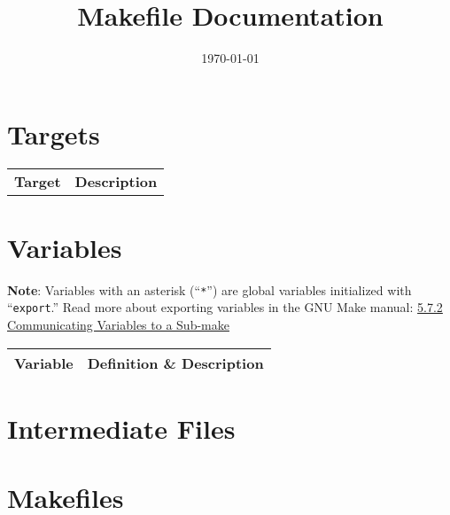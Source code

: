 \documentclass[oneside,11pt]{memoir}
\title{Makefile Documentation}
\date{\today}
\author{}
\begin{document}
    

    \begin{center}
    \end{center}

    \section{Targets}
    \label{targets}

    \tabulinesep=1.2mm
    \begin{longtabu} to 
        \textbf{Target} & \textbf{Description} \\

        

    \end{longtabu}

    \section{Variables}
    \label{variables}

    \textbf{Note}: Variables with an asterisk (``\texttt{*}'') are global
        variables initialized with ``\texttt{export}.''
        Read more about exporting variables in the GNU Make manual:
        \href{https://www.gnu.org/software/make/manual/html_node/%
            Variables_002fRecursion.html}{5.7.2 Communicating Variables to a
            Sub-make}


    \begin{longtabu} to 
        \textbf{Variable} & \textbf{Definition \& Description} \\


        \bottomrule
    \end{longtabu}

    \section{Intermediate Files}
    \label{intermediates}

    \begin{description}
        
    \end{description}

    \newpage
    \section{Makefiles}
    \label{makefiles}


    
\end{document}
